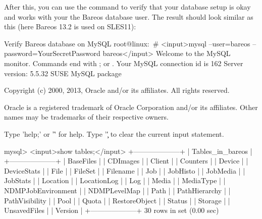 After this, you can use the  command to verify that your database setup is okay
and works with your the Bareos database user.
The result should look similar as this (here Bareos 13.2 is used on SLES11):

\begin{commands}{Verify Bareos database on MySQL}
root@linux:~# <input>mysql --user=bareos --password=YourSecretPassword bareos</input>
Welcome to the MySQL monitor.  Commands end with ; or \g.
Your MySQL connection id is 162
Server version: 5.5.32 SUSE MySQL package

Copyright (c) 2000, 2013, Oracle and/or its affiliates. All rights reserved.

Oracle is a registered trademark of Oracle Corporation and/or its
affiliates. Other names may be trademarks of their respective
owners.

Type 'help;' or '\h' for help. Type '\c' to clear the current input statement.

mysql> <input>show tables;</input>
+--------------------+
| Tables_in_bareos   |
+--------------------+
| BaseFiles          |
| CDImages           |
| Client             |
| Counters           |
| Device             |
| DeviceStats        |
| File               |
| FileSet            |
| Filename           |
| Job                |
| JobHisto           |
| JobMedia           |
| JobStats           |
| Location           |
| LocationLog        |
| Log                |
| Media              |
| MediaType          |
| NDMPJobEnvironment |
| NDMPLevelMap       |
| Path               |
| PathHierarchy      |
| PathVisibility     |
| Pool               |
| Quota              |
| RestoreObject      |
| Status             |
| Storage            |
| UnsavedFiles       |
| Version            |
+--------------------+
30 rows in set (0.00 sec)


\end{commands}
